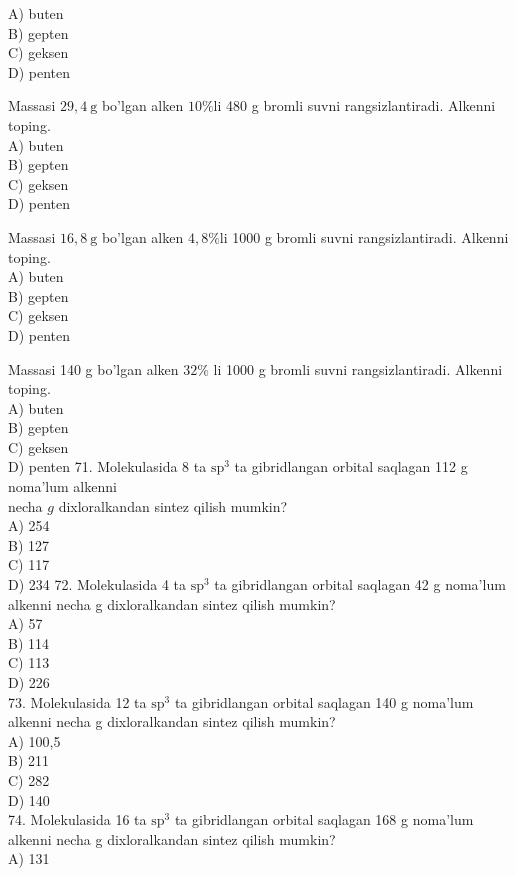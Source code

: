 A) buten\\
B) gepten\\
C) geksen\\
D) penten
  \item Massasi $29,4 \mathrm{~g}$ bo'lgan alken $10 \% \mathrm{li}$ 480 g bromli suvni rangsizlantiradi. Alkenni toping.\\
A) buten\\
B) gepten\\
C) geksen\\
D) penten
  \item Massasi $16,8 \mathrm{~g}$ bo'lgan alken $4,8 \% \mathrm{li}$ 1000 g bromli suvni rangsizlantiradi. Alkenni toping.\\
A) buten\\
B) gepten\\
C) geksen\\
D) penten
  \item Massasi 140 g bo'lgan alken $32 \%$ li 1000 g bromli suvni rangsizlantiradi. Alkenni toping.\\
A) buten\\
B) gepten\\
C) geksen\\
D) penten
71. Molekulasida 8 ta $\mathrm{sp}^{3}$ ta gibridlangan orbital saqlagan 112 g noma'lum alkenni\\
necha $g$ dixloralkandan sintez qilish mumkin?\\
A) 254\\
B) 127\\
C) 117\\
D) 234
72. Molekulasida 4 ta $\mathrm{sp}^{3}$ ta gibridlangan orbital saqlagan 42 g noma'lum alkenni necha g dixloralkandan sintez qilish mumkin?\\
A) 57\\
B) 114\\
C) 113\\
D) 226\\
73. Molekulasida 12 ta $\mathrm{sp}^{3}$ ta gibridlangan orbital saqlagan 140 g noma'lum alkenni necha g dixloralkandan sintez qilish mumkin?\\
A) 100,5\\
B) 211\\
C) 282\\
D) 140\\
74. Molekulasida 16 ta $\mathrm{sp}^{3}$ ta gibridlangan orbital saqlagan 168 g noma'lum alkenni necha g dixloralkandan sintez qilish mumkin?\\
A) 131\\
